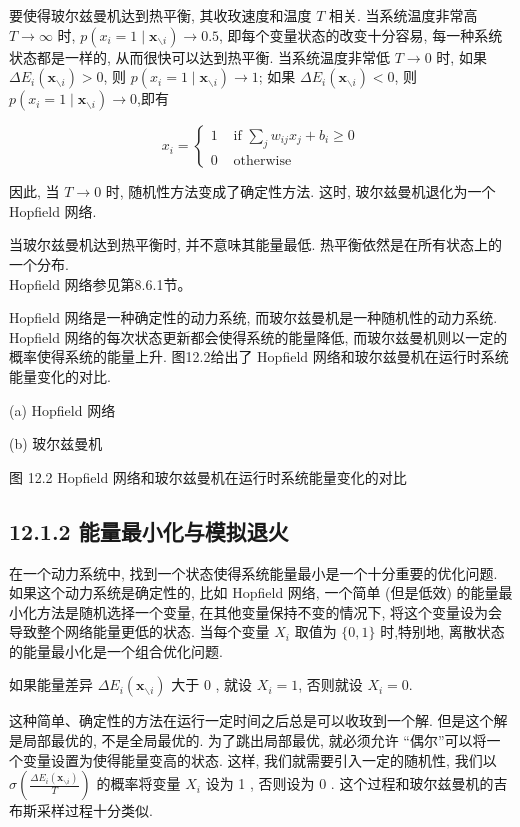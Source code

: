 \documentclass[10pt]{article}
\begin{document}
要使得玻尔兹曼机达到热平衡, 其收玫速度和温度 $T$ 相关. 当系统温度非常高 $T \rightarrow \infty$ 时, $p\left(x_{i}=1 \mid \boldsymbol{x}_{\backslash i}\right) \rightarrow 0.5$, 即每个变量状态的改变十分容易, 每一种系统状态都是一样的, 从而很快可以达到热平衡. 当系统温度非常低 $T \rightarrow 0$ 时, 如果 $\Delta E_{i}\left(\boldsymbol{x}_{\backslash i}\right)>0$, 则 $p\left(x_{i}=1 \mid \boldsymbol{x}_{\backslash i}\right) \rightarrow 1$; 如果 $\Delta E_{i}\left(\boldsymbol{x}_{\backslash i}\right)<0$, 则 $p\left(x_{i}=1 \mid \boldsymbol{x}_{\backslash i}\right) \rightarrow 0$,即有

\[
x_{i}= \begin{cases}1 & \text { if } \sum_{j} w_{i j} x_{j}+b_{i} \geq 0  \tag{12.15}\\ 0 & \text { otherwise }\end{cases}
\]

因此, 当 $T \rightarrow 0$ 时, 随机性方法变成了确定性方法. 这时, 玻尔兹曼机退化为一个 Hopfield 网络.

当玻尔兹曼机达到热平衡时, 并不意味其能量最低. 热平衡依然是在所有状态上的一个分布.\\
Hopfield 网络参见第8.6.1节。

Hopfield 网络是一种确定性的动力系统, 而玻尔兹曼机是一种随机性的动力系统. Hopfield 网络的每次状态更新都会使得系统的能量降低, 而玻尔兹曼机则以一定的概率使得系统的能量上升. 图12.2给出了 Hopfield 网络和玻尔兹曼机在运行时系统能量变化的对比.



(a) Hopfield 网络



(b) 玻尔兹曼机

图 12.2 Hopfield 网络和玻尔兹曼机在运行时系统能量变化的对比

\subsection*{12.1.2 能量最小化与模拟退火}
在一个动力系统中, 找到一个状态使得系统能量最小是一个十分重要的优化问题. 如果这个动力系统是确定性的, 比如 Hopfield 网络, 一个简单 (但是低效) 的能量最小化方法是随机选择一个变量, 在其他变量保持不变的情况下, 将这个变量设为会导致整个网络能量更低的状态. 当每个变量 $X_{i}$ 取值为 $\{0,1\}$ 时,特别地, 离散状态的能量最小化是一个组合优化问题.

如果能量差异 $\Delta E_{i}\left(\boldsymbol{x}_{\backslash i}\right)$ 大于 0 , 就设 $X_{i}=1$, 否则就设 $X_{i}=0$.

这种简单、确定性的方法在运行一定时间之后总是可以收玫到一个解. 但是这个解是局部最优的, 不是全局最优的. 为了跳出局部最优, 就必须允许 “偶尔”可以将一个变量设置为使得能量变高的状态. 这样, 我们就需要引入一定的随机性, 我们以 $\sigma\left(\frac{\Delta E_{i}\left(\boldsymbol{x}_{\backslash i}\right)}{T}\right)$ 的概率将变量 $X_{i}$ 设为 1 , 否则设为 0 . 这个过程和玻尔兹曼机的吉布斯采样过程十分类似.
\end{document}
